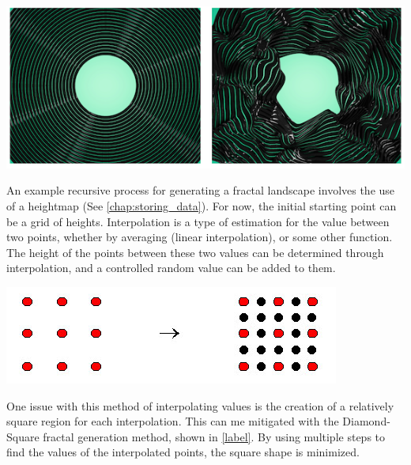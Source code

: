 \documentclass[10pt]{report}
\begin{document}
			\begin{minipage}{\textwidth}
				\centering
				\includegraphics[scale=1.0]{fractal_displacement1}
				\label{fig:fractal_displacement1}
			\end{minipage}
			
			An example recursive process for generating a fractal landscape involves the use of a heightmap (See \autoref{chap:storing_data}). For now, the initial starting point can be a grid of heights. Interpolation is a type of estimation for the value between two points, whether by averaging (linear interpolation), or some other function. The height of the points between these two values can be determined through interpolation, and a controlled random value can be added to them. 
			
			\begin{minipage}{\textwidth}
				\centering
				\includegraphics[scale=0.5]{m_alg1}
				\label{fig:m_alg1}
			\end{minipage}
		
			One issue with this method of interpolating values is the creation of a relatively square region for each interpolation. This can me mitigated with the Diamond-Square fractal generation method, shown in \autoref{label}. By using multiple steps to find the values of the interpolated points, the square shape is minimized. 
		
\end{document}
